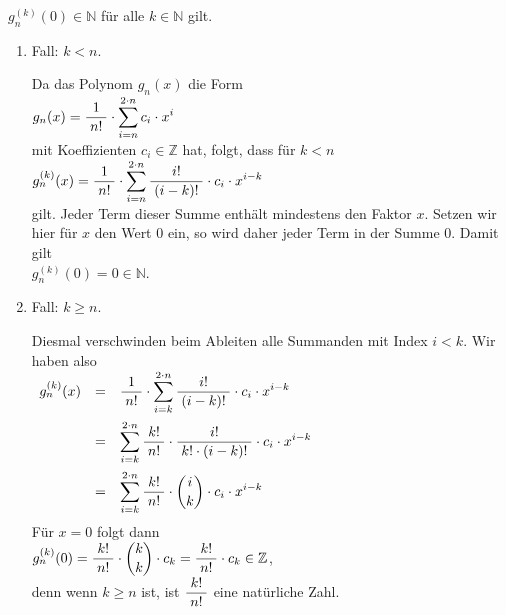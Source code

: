 $g_n^{(k)}(0) \in \mathbb{N}$ f\"ur alle $k \in \mathbb{N}$ gilt.
\begin{enumerate}
\item Fall: $k < n$.

      Da das Polynom $g_n(x)$ die Form
      \\[0.2cm]
      \hspace*{1.3cm}
      $g_n(x) = \displaystyle\frac{\;\displaystyle1\;}{\;\displaystyle n!\;} \cdot \sum\limits_{i=n}^{2\cdot n} c_i \cdot x^i$
      \\[0.2cm]
      mit Koeffizienten $c_i \in \mathbb{Z}$ hat, folgt, dass f\"ur $k < n$ 
      \\[0.2cm]
      \hspace*{1.3cm}
      $g_n^{(k)}(x) = \displaystyle\frac{\;\displaystyle1\;}{\;\displaystyle n!\;} \cdot \displaystyle\sum\limits_{i=n}^{2\cdot n} 
             \displaystyle\frac{\;\displaystyle i!\;}{\;\displaystyle(i- k)!\;} \cdot c_i \cdot x^{i- k}$
      \\[0.2cm]
      gilt.  Jeder Term dieser Summe enth\"alt mindestens den Faktor $x$.
      Setzen wir hier f\"ur $x$ den Wert $0$ ein, so wird daher jeder Term in der Summe $0$.  Damit
      gilt 
      \\[0.2cm]
      \hspace*{1.3cm}
      $g_n^{(k)}(0) = 0 \in \mathbb{N}$.
\item Fall: $k \geq n$.

      Diesmal verschwinden beim Ableiten alle Summanden mit Index $i < k$.  Wir haben also
      \\[0.2cm]
      \hspace*{1.3cm}
      $
      \begin{array}[t]{lcl}
        g_n^{(k)}(x) & = &
        \displaystyle\frac{\;\displaystyle1\;}{\;\displaystyle n!\;} \cdot \displaystyle\sum\limits_{i=k}^{2\cdot n} 
        \displaystyle\frac{\;\displaystyle i!\;}{\;\displaystyle(i-k)!\;} \cdot c_i \cdot x^{i-k}                     \\[0.5cm]
        & = &
        \displaystyle\sum\limits_{i=k}^{2\cdot n} 
        \displaystyle\frac{\;\displaystyle k!\;}{\;\displaystyle n!\;} \cdot \displaystyle\frac{\;\displaystyle i!\;}{\;\displaystyle k! \cdot (i-k)!\;} \cdot c_i \cdot x^{i-k}                     \\[0.5cm]
        & = &
        \displaystyle\sum\limits_{i=k}^{2\cdot n} 
        \displaystyle\frac{\;\displaystyle k!\;}{\;\displaystyle n!\;} \cdot {i \choose k} \cdot c_i \cdot x^{i-k}                     \\[0.5cm]
      \end{array}
      $
      \\[0.2cm]
      F\"ur $x = 0$ folgt dann
      \\[0.2cm]
      \hspace*{1.3cm}
      $g_n^{(k)}(0) = \displaystyle\frac{\;\displaystyle k!\;}{\;\displaystyle n!\;} \cdot {k \choose k} \cdot c_k = \displaystyle\frac{\;\displaystyle k!\;}{\;\displaystyle n!\;} \cdot c_k \in \mathbb{Z}$,
      \\[0.2cm]
      denn wenn $k \geq n$ ist, ist $\displaystyle\frac{\;\displaystyle k!\;}{\;\displaystyle n!\;}$ eine nat\"urliche Zahl.
\end{enumerate}
